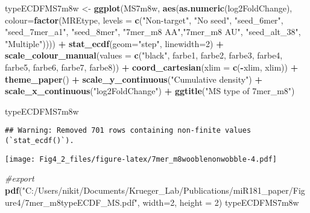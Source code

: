\documentclass[
]{article}
\newenvironment{Shaded}{\begin{snugshade}}{\end{snugshade}}
\newcommand{\AttributeTok}[1]{\textcolor[rgb]{0.13,0.29,0.53}{#1}}
\newcommand{\CommentTok}[1]{\textcolor[rgb]{0.56,0.35,0.01}{\textit{#1}}}
\newcommand{\DecValTok}[1]{\textcolor[rgb]{0.00,0.00,0.81}{#1}}
\newcommand{\FunctionTok}[1]{\textcolor[rgb]{0.13,0.29,0.53}{\textbf{#1}}}
\newcommand{\NormalTok}[1]{#1}
\newcommand{\OtherTok}[1]{\textcolor[rgb]{0.56,0.35,0.01}{#1}}
\newcommand{\SpecialCharTok}[1]{\textcolor[rgb]{0.81,0.36,0.00}{\textbf{#1}}}
\newcommand{\StringTok}[1]{\textcolor[rgb]{0.31,0.60,0.02}{#1}}
\begin{document}
\begin{Shaded}
\begin{Highlighting}[]
\NormalTok{typeECDFMS7m8w }\OtherTok{\textless{}{-}} \FunctionTok{ggplot}\NormalTok{(MS7m8w, }\FunctionTok{aes}\NormalTok{(}\FunctionTok{as.numeric}\NormalTok{(log2FoldChange), }
                              \AttributeTok{colour=}\FunctionTok{factor}\NormalTok{(MREtype, }\AttributeTok{levels =} \FunctionTok{c}\NormalTok{(}\StringTok{"Non{-}target"}\NormalTok{, }\StringTok{"No seed"}\NormalTok{, }\StringTok{"seed\_6mer"}\NormalTok{, }\StringTok{"seed\_7mer\_a1"}\NormalTok{, }\StringTok{"seed\_8mer"}\NormalTok{, }\StringTok{"7mer\_m8 AA"}\NormalTok{,}\StringTok{"7mer\_m8 AU"}\NormalTok{, }\StringTok{"seed\_alt\_38"}\NormalTok{, }\StringTok{"Multiple"}\NormalTok{)))) }\SpecialCharTok{+} 
  \FunctionTok{stat\_ecdf}\NormalTok{(}\AttributeTok{geom=}\StringTok{"step"}\NormalTok{, }\AttributeTok{linewidth=}\DecValTok{2}\NormalTok{) }\SpecialCharTok{+}
  \FunctionTok{scale\_colour\_manual}\NormalTok{(}\AttributeTok{values =} \FunctionTok{c}\NormalTok{(}\StringTok{"black"}\NormalTok{, farbe1, farbe2, farbe3, farbe4, farbe5, farbe6, farbe7, farbe8)) }\SpecialCharTok{+}
  \FunctionTok{coord\_cartesian}\NormalTok{(}\AttributeTok{xlim =} \FunctionTok{c}\NormalTok{(}\SpecialCharTok{{-}}\NormalTok{xlim, xlim)) }\SpecialCharTok{+} 
  \FunctionTok{theme\_paper}\NormalTok{() }\SpecialCharTok{+}
  \FunctionTok{scale\_y\_continuous}\NormalTok{(}\StringTok{"Cumulative density"}\NormalTok{) }\SpecialCharTok{+} \FunctionTok{scale\_x\_continuous}\NormalTok{(}\StringTok{"log2FoldChange"}\NormalTok{) }\SpecialCharTok{+}
  \FunctionTok{ggtitle}\NormalTok{(}\StringTok{"MS type of 7mer\_m8"}\NormalTok{)}

\NormalTok{typeECDFMS7m8w}
\end{Highlighting}
\end{Shaded}

\begin{verbatim}
## Warning: Removed 701 rows containing non-finite values (`stat_ecdf()`).
\end{verbatim}

\texttt{[image: Fig4\_2\_files/figure-latex/7mer\_m8wooblenonwobble-4.pdf]}

\begin{Shaded}
\begin{Highlighting}[]
\CommentTok{\#export}
\FunctionTok{pdf}\NormalTok{(}\StringTok{"C:/Users/nikit/Documents/Krueger\_Lab/Publications/miR181\_paper/Figure4/7mer\_m8typeECDF\_MS.pdf"}\NormalTok{, }\AttributeTok{width=}\DecValTok{2}\NormalTok{, }\AttributeTok{height =} \DecValTok{2}\NormalTok{)}
\NormalTok{typeECDFMS7m8w}
\end{Highlighting}
\end{Shaded}
\end{document}
